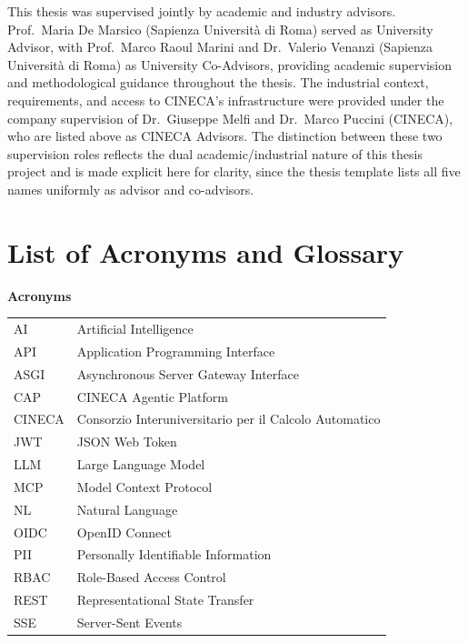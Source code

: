 \documentclass[a4paper,noexaminfo]{sapthesis}
\begin{document}

\begin{acknowledgments}
This thesis was supervised jointly by academic and industry advisors.
Prof.~Maria De Marsico (Sapienza Universit\`a di Roma) served as
University Advisor, with Prof.~Marco Raoul Marini and Dr.~Valerio
Venanzi (Sapienza Universit\`a di Roma) as University Co-Advisors,
providing academic supervision and methodological guidance throughout
the thesis. The industrial context, requirements, and access to CINECA's
infrastructure were provided under the company supervision of
Dr.~Giuseppe Melfi and Dr.~Marco Puccini (CINECA), who are listed above
as CINECA Advisors. The distinction between these two supervision roles
reflects the dual academic/industrial nature of this thesis project and
is made explicit here for clarity, since the thesis template lists all
five names uniformly as advisor and co-advisors.
\end{acknowledgments}

{\let\cleardoublepage\clearpage\tableofcontents}



\chapter*{List of Acronyms and Glossary}

\vspace{0.5cm}
\noindent\textbf{\large Acronyms}
\vspace{0.3cm}

\noindent\begin{tabularx}{\textwidth}{@{}l X@{}}
AI     & Artificial Intelligence \\
API    & Application Programming Interface \\
ASGI   & Asynchronous Server Gateway Interface \\
CAP    & CINECA Agentic Platform \\
CINECA & Consorzio Interuniversitario per il Calcolo Automatico \\
JWT    & JSON Web Token \\
LLM    & Large Language Model \\
MCP    & Model Context Protocol \\
NL     & Natural Language \\
OIDC   & OpenID Connect \\
PII    & Personally Identifiable Information \\
RBAC   & Role-Based Access Control \\
REST   & Representational State Transfer \\
SSE    & Server-Sent Events \\
\end{tabularx}
\end{document}

